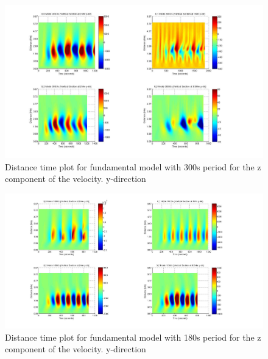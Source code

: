 \documentclass{aa}
\begin{document}
\begin{figure}[h]
\includegraphics[scale=0.4]{imagesn/dt_300_vert_y.jpg}
\caption{Distance time plot for fundamental model with 300s period for the z component of the velocity. y-direction }
\end{figure}


\begin{figure}[h]
\includegraphics[scale=0.4]{imagesn/dt_180_vert_y.jpg}
\caption{Distance time plot for fundamental model with 180s period for the z component of the velocity.  y-direction}
\end{figure}
\end{document}

